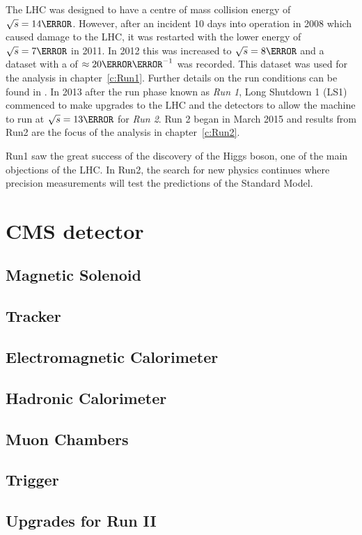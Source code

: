  The LHC was designed to have a centre of mass collision energy of $\sqrt{s} = 14 \TeV$. However, after an incident 10 days into operation in 2008 which caused damage to the LHC, it was restarted with the lower energy of $\sqrt{s} = 7 \TeV$ in 2011. In 2012 this was increased to $\sqrt{s} = 8 \TeV$ and a dataset with a  of $\approx 20 \fbinv$ was recorded. This dataset was used for the analysis in chapter~\ref{c:Run1}. Further details on the run conditions can be found in . In 2013 after the run phase known as \emph{Run 1}, Long Shutdown 1 (LS1) commenced to make upgrades to the LHC and the detectors to allow the machine to run at $\sqrt{s} = 13 \TeV$ for \emph{Run 2}. Run 2 began in March 2015 and results from Run2 are the focus of the analysis in chapter~\ref{c:Run2}.

Run1 saw the great success of the discovery of the Higgs boson, one of the main objections of the LHC. In Run2, the search for new physics continues where precision measurements will test the predictions of the Standard Model.

\section{CMS detector}
\label{sec:CMSdet}

\subsection{Magnetic Solenoid}

\subsection{Tracker}

\subsection{Electromagnetic Calorimeter}

\subsection{Hadronic Calorimeter}

\subsection{Muon Chambers}

\subsection{Trigger}



\subsection{Upgrades for Run II}
